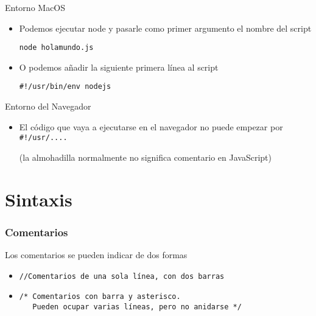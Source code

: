 \documentclass[ucs]{beamer}
\begin{document}
\begin{frame}[fragile]

Entorno MacOS
\begin{itemize}
    \item

Podemos ejecutar node y pasarle como primer argumento el nombre
del script
  \begin{scriptsize}
  \begin{verbatim}
node holamundo.js
  \end{verbatim}
  \end{scriptsize}

    \item
O podemos añadir la siguiente primera línea al script
  \begin{scriptsize}
  \begin{verbatim}
#!/usr/bin/env nodejs
  \end{verbatim}
  \end{scriptsize}
    \end{itemize}


Entorno del Navegador

    \begin{itemize}
    \item
El código que vaya a ejecutarse en el navegador  no puede
empezar por \verb|#!/usr/....|


(la almohadilla
normalmente no significa comentario en JavaScript)
    \end{itemize}

\end{frame}


\section{Sintaxis}
\begin{frame}[fragile]
\frametitle{Comentarios}

Los comentarios se pueden indicar de dos formas

    \begin{itemize}
    \item
  \begin{verbatim}
//Comentarios de una sola línea, con dos barras
  \end{verbatim}
    \item

  \begin{verbatim}
/* Comentarios con barra y asterisco.
   Pueden ocupar varias líneas, pero no anidarse */
  \end{verbatim}
    \end{itemize}

\end{frame}
\end{document}
